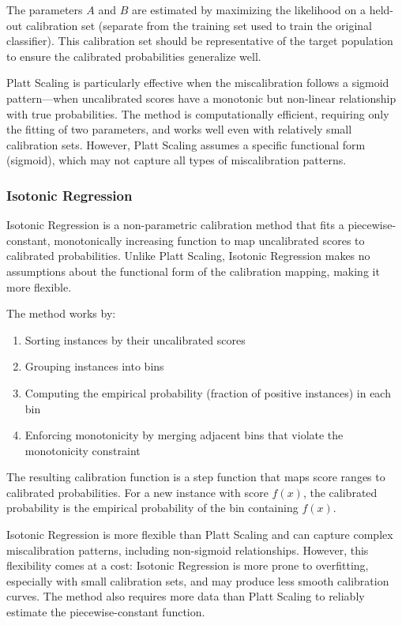 The parameters $A$ and $B$ are estimated by maximizing the likelihood on a held-out calibration set (separate from the training set used to train the original classifier). This calibration set should be representative of the target population to ensure the calibrated probabilities generalize well.

Platt Scaling is particularly effective when the miscalibration follows a sigmoid pattern—when uncalibrated scores have a monotonic but non-linear relationship with true probabilities. The method is computationally efficient, requiring only the fitting of two parameters, and works well even with relatively small calibration sets. However, Platt Scaling assumes a specific functional form (sigmoid), which may not capture all types of miscalibration patterns.

\subsubsection{Isotonic Regression}

Isotonic Regression is a non-parametric calibration method that fits a piecewise-constant, monotonically increasing function to map uncalibrated scores to calibrated probabilities. Unlike Platt Scaling, Isotonic Regression makes no assumptions about the functional form of the calibration mapping, making it more flexible.

The method works by:
\begin{enumerate}
    \item Sorting instances by their uncalibrated scores
    \item Grouping instances into bins
    \item Computing the empirical probability (fraction of positive instances) in each bin
    \item Enforcing monotonicity by merging adjacent bins that violate the monotonicity constraint
\end{enumerate}

The resulting calibration function is a step function that maps score ranges to calibrated probabilities. For a new instance with score $f(x)$, the calibrated probability is the empirical probability of the bin containing $f(x)$.

Isotonic Regression is more flexible than Platt Scaling and can capture complex miscalibration patterns, including non-sigmoid relationships. However, this flexibility comes at a cost: Isotonic Regression is more prone to overfitting, especially with small calibration sets, and may produce less smooth calibration curves. The method also requires more data than Platt Scaling to reliably estimate the piecewise-constant function.

